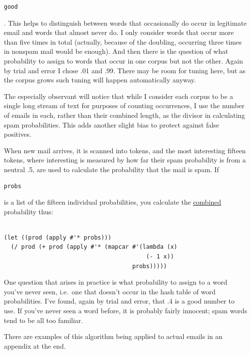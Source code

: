 \documentclass[12pt]{book}
\begin{document}
\begin{verbatim}
good
\end{verbatim}

. This helps to distinguish between words that occasionally do occur in
legitimate email and words that almost never do. I only consider words
that occur more than five times in total (actually, because of the
doubling, occurring three times in nonspam mail would be enough). And
then there is the question of what probability to assign to words that
occur in one corpus but not the other. Again by trial and error I chose
.01 and .99. There may be room for tuning here, but as the corpus grows
such tuning will happen automatically anyway.

The especially observant will notice that while I consider each corpus
to be a single long stream of text for purposes of counting occurrences,
I use the number of emails in each, rather than their combined length,
as the divisor in calculating spam probabilities. This adds another
slight bias to protect against false positives.

When new mail arrives, it is scanned into tokens, and the most
interesting fifteen tokens, where interesting is measured by how far
their spam probability is from a neutral .5, are used to calculate the
probability that the mail is spam. If

\begin{verbatim}
probs
\end{verbatim}

is a list of the fifteen individual probabilities, you calculate the
\href{naivebayes.html}{combined} probability thus:

\begin{verbatim}

(let ((prod (apply #'* probs)))
  (/ prod (+ prod (apply #'* (mapcar #'(lambda (x) 
                                         (- 1 x))
                                     probs)))))
\end{verbatim}

One question that arises in practice is what probability to assign to a
word you've never seen, i.e.~one that doesn't occur in the hash table of
word probabilities. I've found, again by trial and error, that .4 is a
good number to use. If you've never seen a word before, it is probably
fairly innocent; spam words tend to be all too familiar.

There are examples of this algorithm being applied to actual emails in
an appendix at the end.
\end{document}
